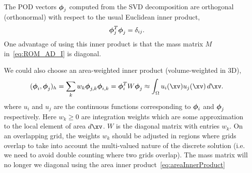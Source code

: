  \label{sec:InnerProduct}


The POD vectors $\boldsymbol{\phi}_j$ computed from the SVD decomposition are orthogonal (orthonormal) with respect to the usual Euclidean inner product,
\begin{align}
   \boldsymbol{\phi}_j ^T \boldsymbol{\phi}_j = \delta_{ij} .
\end{align}
One advantage of using this inner product is that the mass matrix $M$ in~\eqref{eq:ROM_AD_I} is diagonal. 


We could also choose an area-weighted inner product (volume-weighted in 3D),
\begin{align}
   (\phiv_i,\phiv_j)_h = \sum_k w_k \phiv_{j,k} \phiv_{i,k} 
           = \phiv_i^T W \phiv_j \approx \int_\Omega u_i(\xv) u_j(\xv) \,d\xv.  \label{eq:areaInnerProduct}
\end{align}
where $u_i$ and $u_j$ are the continuous functions corresponding to $\boldsymbol{\phi}_i$ and $\boldsymbol{\phi}_j$ respectively.
Here $w_k \ge 0$ are integration weights which are some approximation to the local element of area $d\xv$.
$W$ is the diagonal matrix with entries $w_k$. 
On an overlapping grid, the weights $w_k$ should be adjusted in regions where grids overlap to take into account
the multi-valued nature of the discrete solution (i.e. we need to avoid double counting where two grids overlap).
The mass matrix will no longer we diagonal using the area inner product~\eqref{eq:areaInnerProduct}


